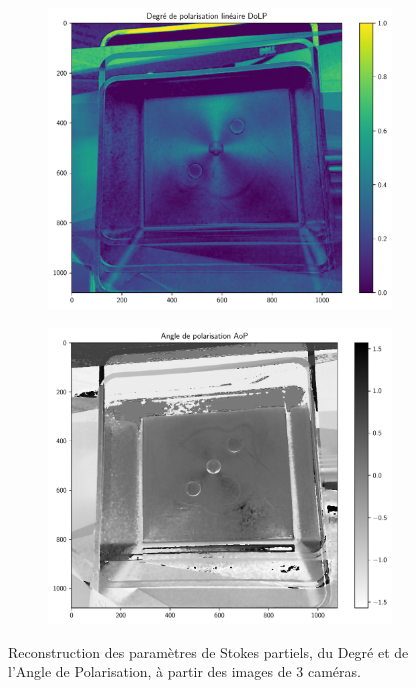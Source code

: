 \begin{figure}[tbph]
\begin{subfigure}[r]{0.495\textwidth}
	\end{subfigure}
	\vspace{1cm}
	\\
	\begin{subfigure}[l]{0.495\textwidth}
		\includegraphics[width=\textwidth]{../Chap2/Figures/img_polDoLP.pdf}
	\end{subfigure}
	\begin{subfigure}[r]{0.495\textwidth}
		\includegraphics[width=\textwidth]{../Chap2/Figures/img_polAoP.pdf}
	\end{subfigure}
	\caption{Reconstruction des paramètres de Stokes partiels, du Degré et de l'Angle de Polarisation, à partir des images de 3 caméras.}
	\label{fig:stokes_reconstruction}
\end{figure}

